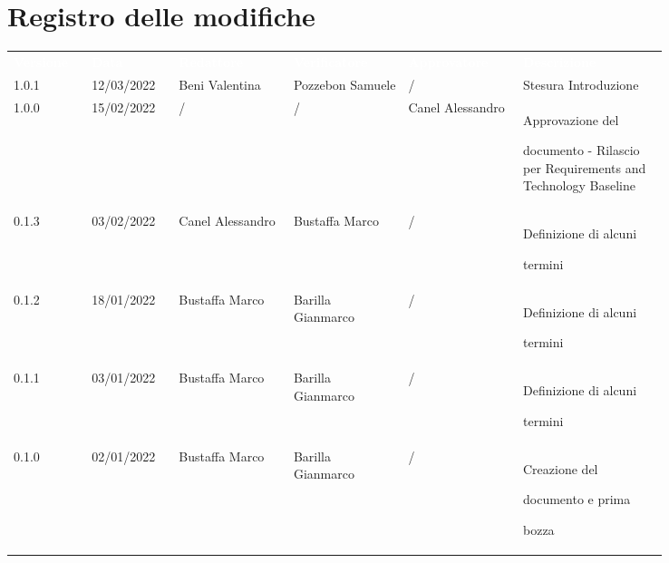 \section*{Registro delle modifiche}

{\renewcommand{\arraystretch}{1.5}
\scriptsize
\begin{tabular}{p{0.10\linewidth}p{0.10\linewidth}p{0.15\linewidth}p{0.15\linewidth}p{0.15\linewidth}p{0.19\linewidth}}
	\rowcolor[RGB]{33, 73, 50}
	\textcolor{white}{\textbf{Versione}} & \textcolor{white}{\textbf{Data}} &
	\textcolor{white}{\textbf{Redattore}} & \textcolor{white}{\textbf{Verificatore}} &
	\textcolor{white}{\textbf{Approvatore}} & \textcolor{white}{\textbf{Descrizione}}\\
	\rowcolor[RGB]{233, 245, 206}
	1.0.1 & 12/03/2022 & Beni Valentina & Pozzebon Samuele & / & Stesura Introduzione\\
	\rowcolor[RGB]{216, 235, 171}
	1.0.0 & 15/02/2022 & / & / & Canel Alessandro& Approvazione del \par documento - Rilascio per Requirements and Technology Baseline\\
	\rowcolor[RGB]{233, 245, 206}
	0.1.3 & 03/02/2022 & Canel Alessandro & Bustaffa Marco &/& Definizione di alcuni \par termini\\
	\rowcolor[RGB]{216, 235, 171}
	0.1.2 & 18/01/2022 & Bustaffa Marco & Barilla Gianmarco &/& Definizione di alcuni \par termini\\
	\rowcolor[RGB]{233, 245, 206}
	0.1.1 & 03/01/2022 & Bustaffa Marco & Barilla Gianmarco &/& Definizione di alcuni \par termini\\
	\rowcolor[RGB]{216, 235, 171}
	0.1.0 & 02/01/2022 & Bustaffa Marco & Barilla Gianmarco &/& Creazione del \par documento  e prima \par bozza\\
\end{tabular}
}
